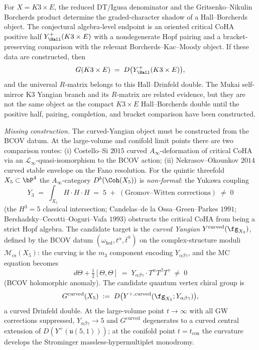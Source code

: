 \begin{conjecture}
\label{thm:GofK3E-baseline}
\ClaimStatusConjectured
For $X = K3 \times E$, the reduced DT/Igusa denominator and the
Gritsenko--Nikulin Borcherds product determine the graded-character
shadow of a Hall--Borcherds object. The conjectural algebra-level
endpoint is an oriented critical CoHA positive half
$Y^+_{\Hall}(K3\times E)$ with a nondegenerate Hopf pairing and a
bracket-preserving comparison with the relevant Borcherds--Kac--Moody
object. If these data are constructed, then
\[
 G(K3 \times E) \;=\; D\bigl(Y^+_{\Hall}(K3\times E)\bigr),
\]
and the universal $R$-matrix belongs to this Hall--Drinfeld double. The
Mukai self-mirror K3 Yangian branch and its $R$-matrix are related
evidence, but they are not the same object as the compact
$K3\times E$ Hall--Borcherds double until the positive half, pairing,
completion, and bracket comparison have been constructed.
\end{conjecture}
\begin{conjecture}
\label{thm:GofQuintic-curved}
\ClaimStatusConjectured
\noindent\emph{Missing construction.} The curved-Yangian object must be
constructed from the BCOV datum. At the large-volume and conifold limit
points there are two comparison routes: (i) Costello--Si $2015$ curved
$A_\infty$-deformation of critical CoHA via an
$\mathcal{L}_\infty$-quasi-isomorphism to the BCOV action; (ii)
Nekrasov--Okounkov $2014$ curved stable envelope on the Fano resolution.
For the quintic threefold $X_5 \subset \bP^4$ the $A_\infty$-category
$D^b(\Coh(X_5))$ is \emph{non-formal}: the Yukawa coupling
\[
 Y_3 \;=\; \int_{X_5} H \cdot H \cdot H \;=\; 5
 \;+\; (\text{Gromov--Witten corrections})
 \;\ne\; 0
\]
(the $H^3 = 5$ classical intersection; Candelas--de la Ossa--Green--Parkes
$1991$; Bershadsky--Cecotti--Ooguri--Vafa $1993$) obstructs the critical
CoHA from being a strict Hopf algebra. The candidate target is the
\emph{curved Yangian} $Y^{\mathrm{curved}}(\fg_{X_5})$, defined by the
BCOV datum $(\omega_{\mathrm{hol}}, t^\alpha, \bar{t}^{\bar\alpha})$ on
the complex-structure moduli $\mathcal{M}_{\mathrm{cs}}(X_5)$: the
curving is the $m_3$ component encoding $Y_{\alpha\beta\gamma}$, and
the MC equation becomes
\[
 d\Theta + \tfrac{1}{2}[\Theta, \Theta] \;=\; Y_{\alpha\beta\gamma}
 \cdot T^\alpha T^\beta T^\gamma \;\ne\; 0
\]
(BCOV holomorphic anomaly). The candidate quantum vertex chiral group is
\[
 G^{\mathrm{curved}}(X_5) \;:=\;
 D\bigl(Y^{+,\mathrm{curved}}(\fg_{X_5}; Y_{\alpha\beta\gamma})\bigr),
\]
a curved Drinfeld double. At the large-volume point $t \to \infty$ with
all GW corrections suppressed, $Y_{\alpha\beta\gamma} \to 5$ and
$G^{\mathrm{curved}}$ degenerates to a curved central extension of
$D(Y^+(\mathfrak{u}(5,1)))$; at the conifold point
$t = t_{\mathrm{con}}$ the curvature develops the Strominger massless-hypermultiplet
monodromy.
\end{conjecture}

